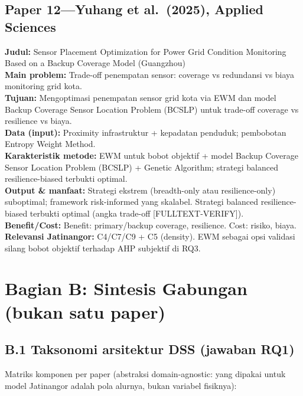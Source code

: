 \documentclass[a4paper,11pt]{article}
\begin{document}
\subsection*{Paper 12---Yuhang et al.\ (2025), Applied Sciences}
\textbf{Judul:} Sensor Placement Optimization for Power Grid Condition Monitoring Based on a Backup Coverage Model (Guangzhou)\\
\textbf{Main problem:} Trade-off penempatan sensor: coverage vs redundansi vs biaya monitoring grid kota.\\
\textbf{Tujuan:} Mengoptimasi penempatan sensor grid kota via EWM dan model Backup Coverage Sensor Location Problem (BCSLP) untuk trade-off coverage vs resilience vs biaya.\\
\textbf{Data (input):} Proximity infrastruktur + kepadatan penduduk; pembobotan Entropy Weight Method.\\
\textbf{Karakteristik metode:} EWM untuk bobot objektif + model Backup Coverage Sensor Location Problem (BCSLP) + Genetic Algorithm; strategi balanced resilience-biased terbukti optimal.\\
\textbf{Output \& manfaat:} Strategi ekstrem (breadth-only atau resilience-only) suboptimal; framework risk-informed yang skalabel. Strategi balanced resilience-biased terbukti optimal (angka trade-off [FULLTEXT-VERIFY]).\\
\textbf{Benefit/Cost:} Benefit: primary/backup coverage, resilience. Cost: risiko, biaya.\\
\textbf{Relevansi Jatinangor:} C4/C7/C9 + C5 (density). EWM sebagai opsi validasi silang bobot objektif terhadap AHP subjektif di RQ3.

\section*{Bagian B: Sintesis Gabungan (bukan satu paper)}

\subsection*{B.1 Taksonomi arsitektur DSS (jawaban RQ1)}

Matriks komponen per paper (abstraksi domain-agnostic: yang dipakai untuk model Jatinangor adalah pola alurnya, bukan variabel fisiknya):
\end{document}
